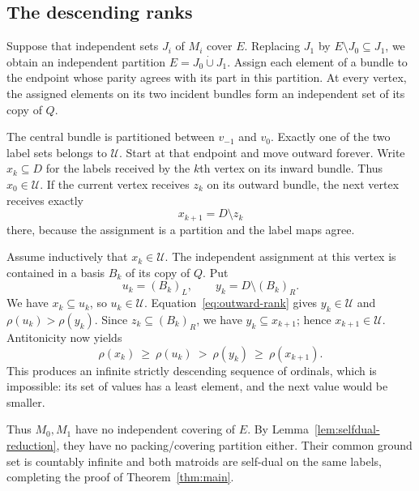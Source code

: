 \subsection{The descending ranks}

Suppose that independent sets $J_i$ of $M_i$ cover $E$.
Replacing $J_1$ by $E\setminus J_0\subseteq J_1$, we obtain an
independent partition $E=J_0\mathbin{\dot\cup}J_1$.
Assign each element of a bundle to the endpoint whose parity agrees
with its part in this partition. At every vertex, the assigned elements
on its two incident bundles form an independent set of its copy of $Q$.

The central bundle is partitioned between $v_{-1}$ and $v_0$.
Exactly one of the two label sets belongs to $\mathcal U$.
Start at that endpoint and move outward forever. Write $x_k\subseteq D$
for the labels received by the $k$th vertex on its inward bundle.
Thus $x_0\in\mathcal U$. If the current vertex receives $z_k$
on its outward bundle, the next vertex receives exactly
\[
 x_{k+1}=D\setminus z_k
\]
there, because the assignment is a partition and the label maps agree.

Assume inductively that $x_k\in\mathcal U$. The independent
assignment at this vertex is contained in a basis $B_k$ of its copy
of $Q$. Put
\[
 u_k=(B_k)_L,
 \qquad y_k=D\setminus(B_k)_R.
\]
We have $x_k\subseteq u_k$, so $u_k\in\mathcal U$.
Equation~\eqref{eq:outward-rank} gives $y_k\in\mathcal U$ and
$\rho(u_k)>\rho(y_k)$. Since $z_k\subseteq(B_k)_R$,
we have $y_k\subseteq x_{k+1}$; hence $x_{k+1}\in\mathcal U$.
Antitonicity now yields
\begin{equation}\label{eq:ordinal-descent}
 \rho(x_k)\ \ge\ \rho(u_k)\ >\ \rho(y_k)\ \ge\
 \rho(x_{k+1}).
\end{equation}
This produces an infinite strictly descending sequence of ordinals,
which is impossible: its set of values has a least element, and the
next value would be smaller.

Thus $M_0,M_1$ have no independent covering of $E$.
By Lemma~\ref{lem:selfdual-reduction}, they have no packing/covering
partition either. Their common ground set is countably infinite and
both matroids are self-dual on the same labels, completing the proof
of Theorem~\ref{thm:main}.
